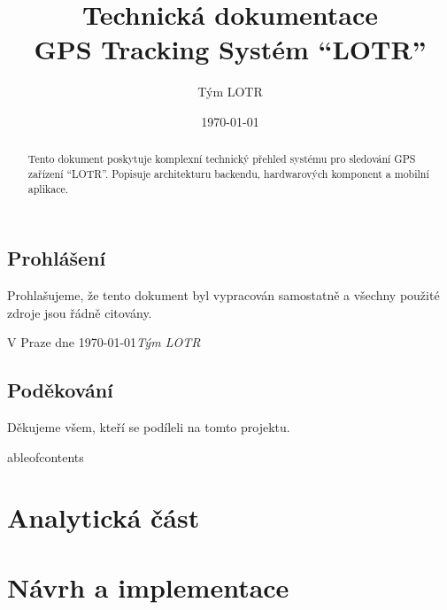 \documentclass[12pt, a4paper]{report}
\title{Technická dokumentace \\ GPS Tracking Systém ``LOTR''}
\author{Tým LOTR}
\date{\today}
\begin{document}
\maketitle

\cleardoublepage
{}

\chapter*{Prohlášení}
Prohlašujeme, že tento dokument byl vypracován samostatně a všechny použité zdroje jsou řádně citovány.

\vspace*{2cm}
\noindent V Praze dne \today \hfill \textit{Tým LOTR}

\chapter*{Poděkování}
Děkujeme všem, kteří se podíleli na tomto projektu.

\begin{abstract}
Tento dokument poskytuje komplexní technický přehled systému pro sledování GPS zařízení ``LOTR''. Popisuje architekturu backendu, hardwarových komponent a mobilní aplikace.
\end{abstract}

	ableofcontents
\listoffigures
\listoftables
\lstlistoflistings

\cleardoublepage
{}


\part{Analytická část}




\part{Návrh a implementace}








\end{document}
